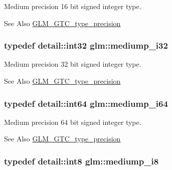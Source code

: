 Medium precision 16 bit signed integer type. \begin{DoxySeeAlso}{See Also}
\hyperlink{group__gtc__type__precision}{G\-L\-M\-\_\-\-G\-T\-C\-\_\-type\-\_\-precision} 
\end{DoxySeeAlso}
\hypertarget{group__gtc__type__precision_ga5e00ec824eb55968a6b6496f294d8c07}{
\subsubsection[{mediump\-\_\-i32}]{\setlength{\rightskip}{0pt plus 5cm}typedef detail\-::int32 {\bf glm\-::mediump\-\_\-i32}}}\label{group__gtc__type__precision_ga5e00ec824eb55968a6b6496f294d8c07}
Medium precision 32 bit signed integer type. \begin{DoxySeeAlso}{See Also}
\hyperlink{group__gtc__type__precision}{G\-L\-M\-\_\-\-G\-T\-C\-\_\-type\-\_\-precision} 
\end{DoxySeeAlso}
\hypertarget{group__gtc__type__precision_ga90fedf6c701ffbe00535156715e50787}{
\subsubsection[{mediump\-\_\-i64}]{\setlength{\rightskip}{0pt plus 5cm}typedef detail\-::int64 {\bf glm\-::mediump\-\_\-i64}}}\label{group__gtc__type__precision_ga90fedf6c701ffbe00535156715e50787}
Medium precision 64 bit signed integer type. \begin{DoxySeeAlso}{See Also}
\hyperlink{group__gtc__type__precision}{G\-L\-M\-\_\-\-G\-T\-C\-\_\-type\-\_\-precision} 
\end{DoxySeeAlso}
\hypertarget{group__gtc__type__precision_ga28a8b5fd51072680bb55178c17cc7411}{
\subsubsection[{mediump\-\_\-i8}]{\setlength{\rightskip}{0pt plus 5cm}typedef detail\-::int8 {\bf glm\-::mediump\-\_\-i8}}}\label{group__gtc__type__precision_ga28a8b5fd51072680bb55178c17cc7411}
